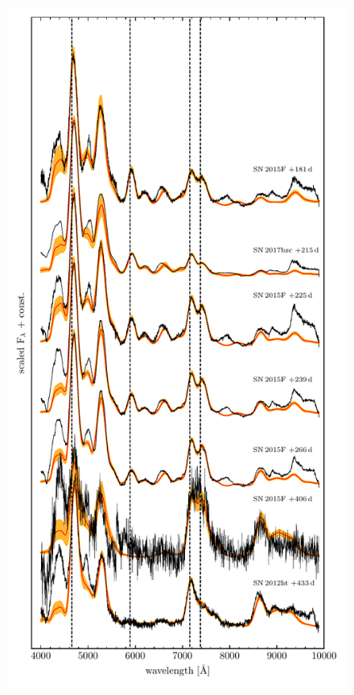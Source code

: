 \documentclass[fleqn,usenatbib]{mnras}
\begin{document}
 
 \begin{figure}
    \centering
    \begin{minipage}{.475\textwidth}
        \centering
        \includegraphics[width=1\linewidth]{plots/Spectra_15F_XSHOOTER_VIS.pdf}

\end{minipage}
\end{figure}
\end{document}
